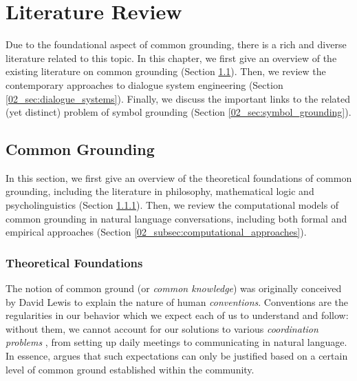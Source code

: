 \graphicspath{{02_literature_review/figures/}} %

\chapter{Literature Review}
\label{02_chp:literature_review}

Due to the foundational aspect of common grounding, there is a rich and diverse literature related to this topic. In this chapter, we first give an overview of the existing literature on common grounding (Section \ref{02_sec:common_grounding}). Then, we review the contemporary approaches to dialogue system engineering (Section \ref{02_sec:dialogue_systems}). Finally, we discuss the important links to the related (yet distinct) problem of symbol grounding (Section \ref{02_sec:symbol_grounding}).

\section{Common Grounding}
\label{02_sec:common_grounding}

In this section, we first give an overview of the theoretical foundations of common grounding, including the literature in philosophy, mathematical logic and psycholinguistics (Section \ref{02_subsec:theoretical_foundations}). Then, we review the computational models of common grounding in natural language conversations, including both formal and empirical approaches (Section \ref{02_subsec:computational_approaches}).

\subsection{Theoretical Foundations}
\label{02_subsec:theoretical_foundations}

The notion of common ground (or \textit{common knowledge}) was originally conceived by David Lewis \citep{lewis1969convention} to explain the nature of human \textit{conventions}. Conventions are the regularities in our behavior which we expect each of us to understand and follow: without them, we cannot account for our solutions to various \textit{coordination problems} \citep{Schelling1960}, from setting up daily meetings to communicating in natural language. In essence, \citeauthor{lewis1969convention} argues that such expectations can only be justified based on a certain level of common ground established within the community.

